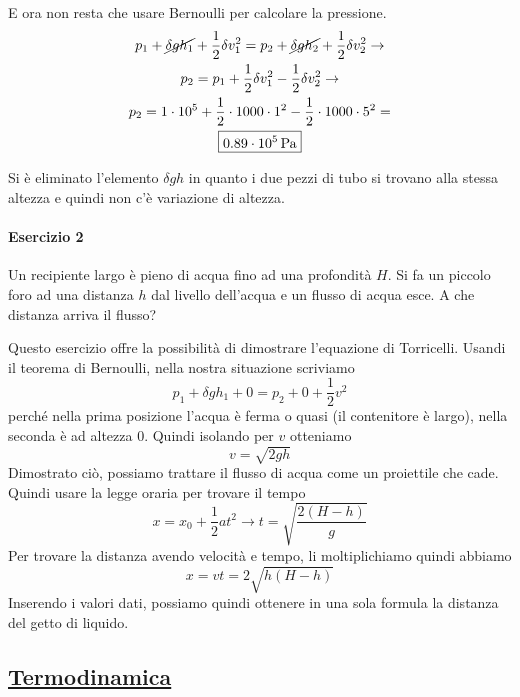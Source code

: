 E ora non resta che usare Bernoulli per	calcolare la pressione.
\begin{gather*}
  p_1 + \cancel{\delta gh_1} + 
  \frac{1}{2}\delta v_1^2 = 
  p_2 + \cancel{\delta gh_2} +
  \frac{1}{2}\delta v_2^2 \rightarrow \\
  p_2 = p_1 + \frac{1}{2}\delta v_1^2 - \frac{1}{2}\delta v_2^2 \rightarrow\\
  p_2 = 1\cdot10^5 + \frac{1}{2}\cdot1000\cdot1^2 - \frac{1}{2}\cdot1000\cdot5^2 =\\
  \boxed{0.89\cdot10^5\,\text{Pa}}
\end{gather*}

Si è eliminato l'elemento $\delta gh$ in quanto i due pezzi di tubo si trovano alla stessa altezza
e quindi non c'è variazione di altezza.

\paragraph{Esercizio 2}
Un recipiente largo è pieno di acqua fino ad una profondità $H$. Si fa un piccolo foro ad una 
distanza $h$ dal livello dell'acqua e un flusso di acqua esce. A che distanza arriva il flusso?
\divisor

Questo esercizio offre la possibilità di dimostrare l'equazione di Torricelli. Usandi il teorema di
Bernoulli, nella nostra situazione scriviamo
\begin{equation*}
  p_1+\delta gh_1+0=p_2+0+\frac{1}{2}v^2
\end{equation*}
perché nella prima posizione l'acqua è ferma o quasi (il contenitore è largo), nella seconda è ad 
altezza $0$. Quindi isolando per $v$ otteniamo
\begin{equation*}
  v=\sqrt{2gh}
\end{equation*}
Dimostrato ciò, possiamo trattare il flusso di acqua come un proiettile che cade. Quindi usare la 
legge oraria per trovare il tempo
\begin{equation*}
  x=x_0+\frac{1}{2}at^2 \rightarrow t = \sqrt{\frac{2(H-h)}{g}}
\end{equation*}
Per trovare la distanza avendo velocità e tempo, li moltiplichiamo quindi abbiamo
\begin{equation*}
  \boxed{x = vt = 2\sqrt{h(H-h)}}
\end{equation*}
Inserendo i valori dati, possiamo quindi ottenere in una sola formula la distanza del getto di liquido.

\subsection*{\hyperref[sec:termodinamica]{Termodinamica}}\label{ex:termodinamica}


